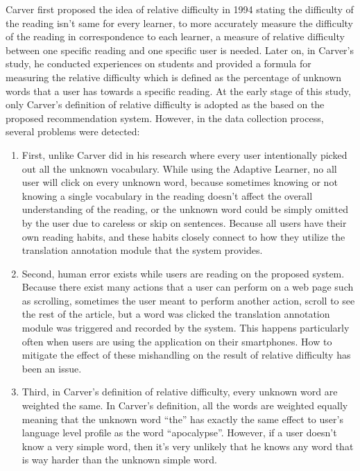 Carver first proposed the idea of relative difficulty in 1994 stating the difficulty of the reading isn't same for every learner, to more accurately measure the difficulty of the reading in correspondence to each learner, a measure of relative difficulty between one specific reading and one specific user is needed. Later on, in Carver's study, he conducted experiences on students and provided a formula for measuring the relative difficulty which is defined as the percentage of unknown words that a user has towards a specific reading. At the early stage of this study, only Carver's definition of relative difficulty is adopted as the based on the proposed recommendation system. However, in the data collection process, several problems were detected:
\begin{enumerate}
  \item First, unlike Carver did in his research where every user intentionally picked out all the unknown vocabulary. While using the Adaptive Learner, no all user will click on every unknown word, because sometimes knowing or not knowing a single vocabulary in the reading doesn't affect the overall understanding of the reading, or the unknown word could be simply omitted by the user due to careless or skip on sentences. Because all users have their own reading habits, and these habits closely connect to how they utilize the translation annotation module that the system provides. 
  \vspace{10pt}
  \item Second, human error exists while users are reading on the proposed system. Because there exist many actions that a user can perform on a web page such as scrolling, sometimes the user meant to perform another action, scroll to see the rest of the article, but a word was clicked the translation annotation module was triggered and recorded by the system. This happens particularly often when users are using the application on their smartphones. How to mitigate the effect of these mishandling on the result of relative difficulty has been an issue. 
  \vspace{10pt}
  \item Third, in Carver's definition of relative difficulty, every unknown word are weighted the same. In Carver's definition, all the words are weighted equally meaning that the unknown word “the” has exactly the same effect to user's language level profile as the word “apocalypse”. However, if a user doesn't know a very simple word, then it's very unlikely that he knows any word that is way harder than the unknown simple word. 
  \vspace{10pt}
\end{enumerate}

